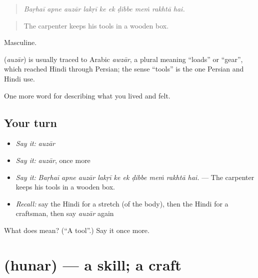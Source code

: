 \begin{quote}
         
\end{quote}

\begin{quote}
\emph{Baṛhaī apne auzār lakṛī ke ek ḍibbe meṁ rakhtā hai.}
\end{quote}

\begin{quote}
The carpenter keeps his tools in a wooden box.
\end{quote}

Masculine.

\begin{cousinweb}
\textbf{} (\emph{auzār}) is usually traced to Arabic \emph{awzār}, a plural meaning \textquotedblleft{}loads\textquotedblright{} or \textquotedblleft{}gear\textquotedblright{}, which reached Hindi through Persian; the sense \textquotedblleft{}tools\textquotedblright{} is the one Persian and Hindi use.
\end{cousinweb}

\begin{grammarlens}[title={What you've built}]
One more word for describing what you lived and felt.
\end{grammarlens}

\subsection*{Your turn}
\begin{itemize}
\raggedright
  \item \emph{Say it:} \emph{auzār}
  \item \emph{Say it:} \emph{auzār}, once more
  \item \emph{Say it:} \emph{Baṛhaī apne auzār lakṛī ke ek ḍibbe meṁ rakhtā hai.} — The carpenter keeps his tools in a wooden box.
  \item \emph{Recall:} say the Hindi for a stretch (of the body), then the Hindi for a craftsman, then say \emph{auzār} again
\end{itemize}

\begin{tcolorbox}[breakable,colback=teal!4,colframe=teal!35!black,title={Before you move on}]
What does  mean? (\textquotedblleft{}A tool\textquotedblright{}.) Say it once more.
\end{tcolorbox}
\section[\texorpdfstring{\hi{हुनर} (hunar)}{हुनर (hunar)}]{ (hunar) — a skill; a craft}

